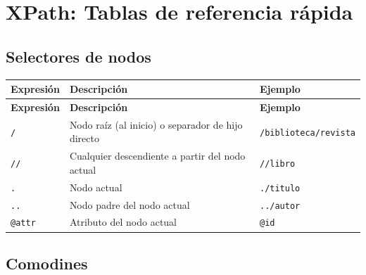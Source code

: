 \documentclass[a4paper, 8pt]{extarticle}
\begin{document}
\section*{XPath: Tablas de referencia rápida}

\subsection*{Selectores de nodos}

\begin{longtable}{@{} p{4cm} p{7cm} p{6.5cm} @{}}
\toprule
\textbf{Expresión} & \textbf{Descripción} & \textbf{Ejemplo} \\
\midrule
\endfirsthead
\toprule
\textbf{Expresión} & \textbf{Descripción} & \textbf{Ejemplo} \\
\midrule
\endhead
\bottomrule
\endfoot
\bottomrule
\endlastfoot

\centering \verb!/!      & Nodo raíz (al inicio) o separador de hijo directo & \verb!/biblioteca/revista! \\
\centering \verb!//!     & Cualquier descendiente a partir del nodo actual   & \verb!//libro!     \\
\centering \verb!.!      & Nodo actual                                       & \verb!./titulo!    \\
\centering \verb!..!     & Nodo padre del nodo actual                        & \verb!../autor!    \\
\centering \verb!@attr!  & Atributo del nodo actual                          & \verb!@id!         \\
\end{longtable}

\subsection*{Comodines}
\end{document}
